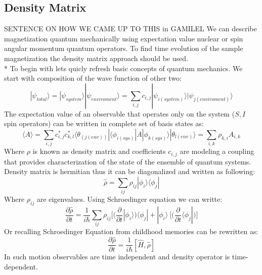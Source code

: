 \subsection{Density Matrix}\label{densitymatrixsubsection} 
SENTENCE ON HOW WE CAME UP TO THIS in GAMILEL
We can describe magnetization quantum mechanically using expectation value nuclear or spin angular momentum quantum operators. To find time evolution of the sample magnetization the density matrix approach should be used.\\* 
To begin with lets quicly refresh basic concepts of quantum mechanics. We start with composition of the wave function of other two: 
\begin{equation}\label{eq:10}
|\psi_{total}\rangle=|\psi_{system}\rangle|\psi_{enviroment}\rangle=\sum_{i,j} c_{i,j}|\psi_{i(system)}\rangle|\psi_{j(enviroment)}\rangle
\end{equation}
The expectation value of an observable that operates only on the system ($S,I$ spin operators) can be written in complete set of basis states as:
\begin{equation}\label{eq:11}
\langle A \rangle=\sum_{i,j} c_{i,j}^*c_{k,l}^*\langle \theta_{(j(env))}|\langle \phi _{i(sys)}|A|\phi_{k(sys)}\rangle|\theta_{l(env)}\rangle=\sum_{i,k}\rho_{k,i}A_{i,k}
\end{equation}
Where $\rho$ is known as density matrix and coefficients $c_{i,j}$ are modeling a coupling that provides characterization of the state of the ensemble of quantum systems. 
Density matrix is hermitian thus it can be diagonalized and written as following: 
\begin{equation}\label{eq:13}
\hat{\rho}=\sum_{ij}\rho_{ij}|\phi_i\rangle\langle \phi_j|
\end{equation} 
Where $\rho_{ij}$ are eigenvalues. Using Schroedinger equation we can writte: 
\begin{equation}\label{eq:14}
\frac{\partial \hat{\rho}}{\partial t}=\frac{1}{i\hbar}\sum_{ij}\rho_{ij}\Big[\Big(\frac{\partial}{\partial t}|\phi_i\rangle\Big)\langle \phi_j|+|\phi_i\rangle\ \Big[\Big(\frac{\partial}{\partial t}\langle \phi_j|\Big)\Big]
\end{equation} 
Or recalling Schroedinger Equation from childhood memories can be rewritten as: 
 \begin{equation}\label{eq:15}
\frac{\partial \hat{\rho}}{\partial t}=\frac{1}{i\hbar}[\hat{H},\hat{\rho}]
\end{equation} 
In such motion observables are time independent and density operator is time-dependent. 
